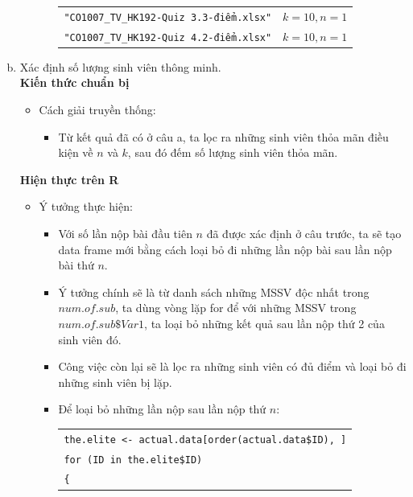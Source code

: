 \documentclass[a4paper]{article}
\theoremstyle{definition}
\begin{document}
\begin{enumerate}[a)]
\begin{itemize}
\begin{itemize}
\begin{center}
\begin{tabular}{l l}
                     \texttt{"CO1007\_TV\_HK192-Quiz 3.3-điểm.xlsx"} & $k = 10, n = 1$\\ 
                     \texttt{"CO1007\_TV\_HK192-Quiz 4.2-điểm.xlsx"} & $k = 10, n = 1$\\ 
                \end{tabular}
            \end{center}
        \end{itemize}
    \end{itemize} 
    \bf\item {Xác định số lượng sinh viên thông minh.}\\[6pt]
    \bf Kiến thức chuẩn bị\normalfont
    \begin{itemize}
        \item Cách giải truyền thống:
        \begin{itemize}
            \item Từ kết quả đã có ở câu a, ta lọc ra những sinh viên thỏa mãn điều kiện về $n$ và $k$, sau đó đếm số lượng sinh viên thỏa mãn.
        \end{itemize}
    \end{itemize}
    \bf Hiện thực trên R\normalfont
    \begin{itemize}
        \item Ý tưởng thực hiện:
        \begin{itemize}
            \item Với số lần nộp bài đầu tiên $n$ đã được xác định ở câu trước, ta sẽ tạo data frame mới bằng cách loại bỏ đi những lần nộp bài sau lần nộp bài thứ $n$.
            \item Ý tưởng chính sẽ là từ danh sách những MSSV độc nhất trong $num.of.sub$, ta dùng vòng lặp for để với những MSSV trong $num.of.sub\$Var1$, ta loại bỏ những kết quả sau lần nộp thứ 2 của sinh viên đó.
            \item Công việc còn lại sẽ là lọc ra những sinh viên có đủ điểm và loại bỏ đi những sinh viên bị lặp.
            \item Để loại bỏ những lần nộp sau lần nộp thứ $n$:
            \begin{center}
                \begin{tabular}{p{13cm}}
                    \texttt{the.elite <- actual.data[order(actual.data\$ID), ]} \\
                    \texttt{for (ID in the.elite\$ID)} \\
                    \texttt{\{} \\

\end{tabular}
\end{center}
\end{itemize}
\end{itemize}
\end{enumerate}
\end{document}
